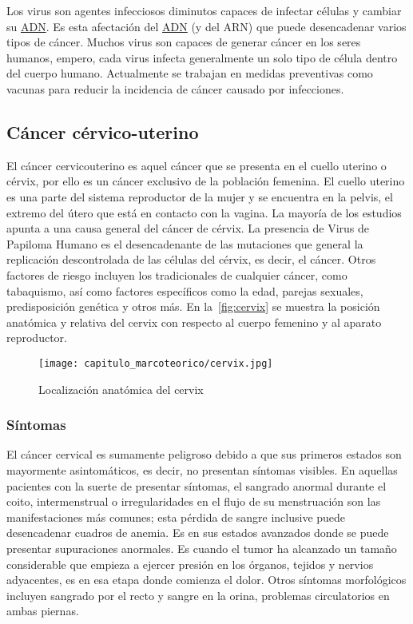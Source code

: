 Los virus son agentes infecciosos diminutos capaces de infectar células y
cambiar su \hyperlink{abbr}{ADN}. Es esta afectación del \hyperlink{abbr}{ADN}
(y del ARN) que puede desencadenar varios tipos de cáncer. Muchos virus son
capaces de generar cáncer en los seres humanos, empero, cada virus infecta
generalmente un solo tipo de célula dentro del cuerpo humano. Actualmente se
trabajan en medidas preventivas como vacunas para reducir la incidencia de
cáncer causado por infecciones. 

\subsection{Cáncer cérvico-uterino}

El cáncer cervicouterino  es aquel cáncer que se
presenta en el cuello uterino o cérvix, por ello es un cáncer exclusivo de la
población femenina. El cuello uterino es una parte del sistema reproductor de la
mujer y se encuentra en la pelvis, el extremo del útero que está en contacto con
la vagina. La mayoría de los estudios apunta a una causa general del cáncer de
cérvix. La presencia de Virus de Papiloma Humano es el desencadenante de las
mutaciones que general la replicación descontrolada de las células del cérvix,
es decir, el cáncer. Otros factores de riesgo incluyen los tradicionales de
cualquier cáncer, como tabaquismo, así como factores específicos como la edad,
parejas sexuales, predisposición genética y otros más. En
la~\autoref{fig:cervix} se muestra la posición anatómica y relativa del cervix
con respecto al cuerpo femenino y al aparato reproductor.

\begin{figure}[H]
    \centering
    \texttt{[image: capitulo\_marcoteorico/cervix.jpg]}
    \caption{Localización anatómica del cervix}
    \label{fig:cervix}
\end{figure}


\subsubsection{Síntomas}

El cáncer cervical es sumamente peligroso debido a que sus primeros estados son
mayormente asintomáticos, es decir, no presentan síntomas visibles. En aquellas
pacientes con la suerte de presentar síntomas, el sangrado anormal durante el
coito, intermenstrual o irregularidades en el flujo de su menstruación son las
manifestaciones más comunes; esta pérdida de sangre inclusive puede desencadenar
cuadros de anemia. Es en sus estados avanzados donde se puede presentar
supuraciones anormales. Es cuando el tumor ha alcanzado un tamaño considerable
que empieza a ejercer presión en los órganos, tejidos y nervios  adyacentes, es
en esa etapa donde comienza el dolor. Otros síntomas morfológicos incluyen
sangrado por el recto y sangre en la orina, problemas circulatorios en ambas
piernas. 

